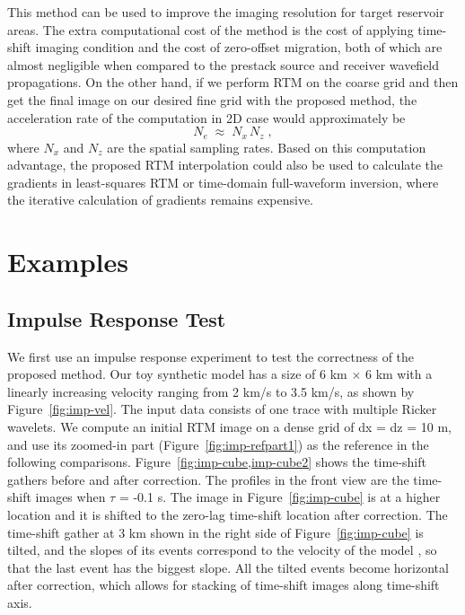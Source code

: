 This method can be used to improve the imaging resolution for target reservoir areas.
The extra computational cost of the method is the cost of applying time-shift imaging condition and the cost of zero-offset migration,
both of which are almost negligible when compared to the prestack source and receiver wavefield propagations.
On the other hand, if we perform RTM on the coarse grid and then get the final image on our desired fine grid with the proposed method,
the acceleration rate of the computation in 2D case would approximately be
\begin{equation}
	\label{eq:efficiency}
	N_e \; \approx \; N_x \, N_z \; ,
\end{equation}
where $N_x$ and $N_z$ are the spatial sampling rates.
Based on this computation advantage, the proposed RTM interpolation could also be used to calculate
the gradients in least-squares RTM or time-domain full-waveform inversion,
where the iterative calculation of gradients remains expensive.

\section{Examples}
\subsection{Impulse Response Test}

We first use an impulse response experiment to test the correctness of the proposed method.
Our toy synthetic model has a size of 6 km $\times$ 6 km with a linearly increasing velocity ranging from 2 km/s to 3.5 km/s, as shown by Figure~\ref{fig:imp-vel}.
The input data consists of one trace with multiple Ricker wavelets.
We compute an initial RTM image on a dense grid of dx = dz = 10 m,
and use its zoomed-in part (Figure~\ref{fig:imp-refpart1}) as the reference in the following comparisons.
Figure~\ref{fig:imp-cube,imp-cube2} shows the time-shift gathers before and after correction.
The profiles in the front view are the time-shift images when $\tau$ = -0.1 s.
The image in Figure~\ref{fig:imp-cube} is at a higher location
and it is shifted to the zero-lag time-shift location after correction.
The time-shift gather at 3 km shown in the right side of Figure~\ref{fig:imp-cube} is tilted, and the slopes of
its events correspond to the velocity of the model \cite[]{sava06,xu14}, so that the last event has the biggest slope.
All the tilted events become horizontal after correction, which allows for stacking of time-shift images along time-shift axis.

